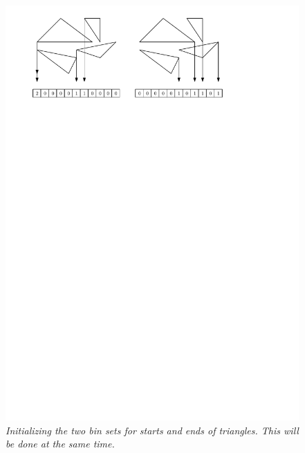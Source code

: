\documentclass[12pt]{article}
\begin{document}
\begin{figure}
\centering
  \includegraphics{figs/binning}
  \caption{\textit{Initializing the two bin sets for starts and ends of triangles. This will be done at the same time.}}
  \label{fig:binning}
\end{figure}
\end{document}
